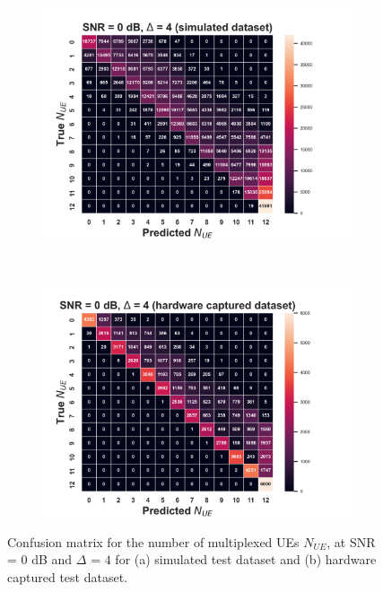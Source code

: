 \documentclass[journal]{IEEEtran}
\begin{document}
\begin{figure}[ht!]
    \captionsetup{justification=justified}
     \centering
     \begin{subfigure}[b]{0.48\textwidth}
         \centering
         \includegraphics[width=\textwidth]{Figures/Conf_mtx_num_UEs_SNR_0_dB_Max_off_4_train_sim_test_sim.png}
         \caption{}
         \label{fig: cm_num_UE_snr_0_off_4_sim}
     \end{subfigure}
     \\
     \begin{subfigure}[b]{0.48\textwidth}
         \centering
         \includegraphics[width=\textwidth]{Figures/Conf_mtx_num_UEs_SNR_0_dB_Max_off_4_train_sim_test_hw.png}
         \caption{}
         \label{fig: cm_num_UE_snr_0_off_4_hw}
     \end{subfigure}
        \caption{Confusion matrix for the number of multiplexed UEs $N_{UE}$, at SNR = $0$ dB and $\Delta$ = $4$ for (a) simulated test dataset and (b) hardware captured test dataset.}
        \label{fig: cm_num_UE_snr_0_off_4}
\end{figure}
\end{document}
